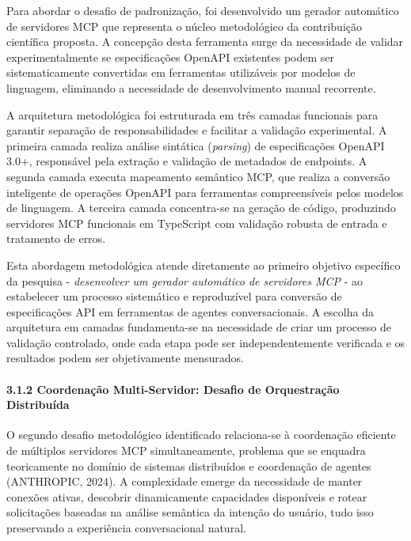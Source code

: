 \documentclass[
]{article}
\begin{document}
Para abordar o desafio de padronização, foi desenvolvido um gerador
automático de servidores MCP que representa o núcleo metodológico da
contribuição científica proposta. A concepção desta ferramenta surge da
necessidade de validar experimentalmente se especificações OpenAPI
existentes podem ser sistematicamente convertidas em ferramentas
utilizáveis por modelos de linguagem, eliminando a necessidade de
desenvolvimento manual recorrente.

A arquitetura metodológica foi estruturada em três camadas funcionais
para garantir separação de responsabilidades e facilitar a validação
experimental. A primeira camada realiza análise sintática
(\emph{parsing}) de especificações OpenAPI 3.0+, responsável pela
extração e validação de metadados de endpoints. A segunda camada executa
mapeamento semântico MCP, que realiza a conversão inteligente de
operações OpenAPI para ferramentas compreensíveis pelos modelos de
linguagem. A terceira camada concentra-se na geração de código,
produzindo servidores MCP funcionais em TypeScript com validação robusta
de entrada e tratamento de erros.

Esta abordagem metodológica atende diretamente ao primeiro objetivo
específico da pesquisa - \emph{desenvolver um gerador automático de
servidores MCP} - ao estabelecer um processo sistemático e reproduzível
para conversão de especificações API em ferramentas de agentes
conversacionais. A escolha da arquitetura em camadas fundamenta-se na
necessidade de criar um processo de validação controlado, onde cada
etapa pode ser independentemente verificada e os resultados podem ser
objetivamente mensurados.

\paragraph{3.1.2 Coordenação Multi-Servidor: Desafio de Orquestração
Distribuída}\label{coordenauxe7uxe3o-multi-servidor-desafio-de-orquestrauxe7uxe3o-distribuuxedda}

O segundo desafio metodológico identificado relaciona-se à coordenação
eficiente de múltiplos servidores MCP simultaneamente, problema que se
enquadra teoricamente no domínio de sistemas distribuídos e coordenação
de agentes (ANTHROPIC, 2024). A complexidade emerge da necessidade de
manter conexões ativas, descobrir dinamicamente capacidades disponíveis
e rotear solicitações baseadas na análise semântica da intenção do
usuário, tudo isso preservando a experiência conversacional natural.
\end{document}
